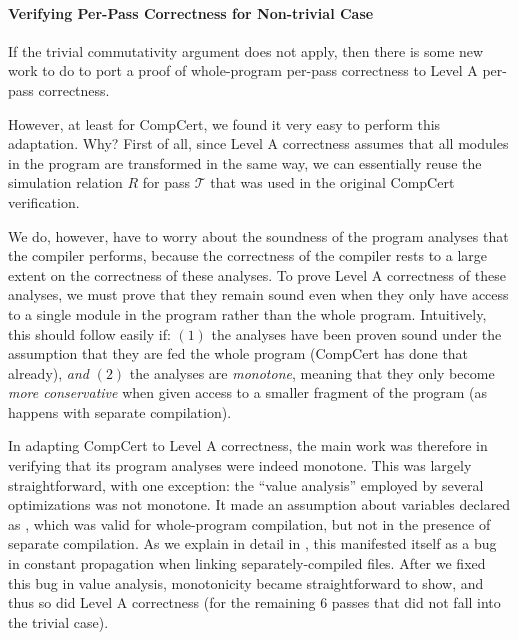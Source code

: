 \paragraph{Verifying Per-Pass Correctness for Non-trivial Case}

If the trivial commutativity argument does not apply, then there is some
new work to do to port a proof of whole-program per-pass correctness to Level A per-pass
correctness.

However, at least for CompCert, we found it very easy to perform this adaptation.  Why?  First of
all, since Level A correctness assumes that all modules in the program are transformed in the same
way, we can essentially reuse the simulation relation $R$ for pass $\mathcal{T}$ that was used in
the original CompCert verification.

We do, however, have to worry about the soundness of the program analyses that the compiler
performs, because the correctness of the compiler rests to a large extent on the correctness of
these analyses.  To prove Level A correctness of these analyses, we must prove that they remain
sound even when they only have access to a single module in the program rather than the whole
program.  Intuitively, this should follow easily if: $(1)$ the analyses have been proven sound under
the assumption that they are fed the whole program (CompCert has done that already), \emph{and}
$(2)$ the analyses are \emph{monotone}, meaning that they only become \emph{more conservative} when
given access to a smaller fragment of the program (as happens with separate compilation).

In adapting CompCert to Level A correctness, the main work was therefore in verifying that its
program analyses were indeed monotone.  This was largely straightforward, with one exception: the
``value analysis'' employed by several optimizations was not monotone.  It made an assumption about
variables declared as , which was valid for whole-program compilation, but not in
the presence of separate compilation.  As we explain in detail in , this
manifested itself as a bug in constant propagation when linking separately-compiled files.  After we
fixed this bug in value analysis, monotonicity became straightforward to show, and thus so did Level
A correctness (for the remaining 6 passes that did not fall into the trivial case).








